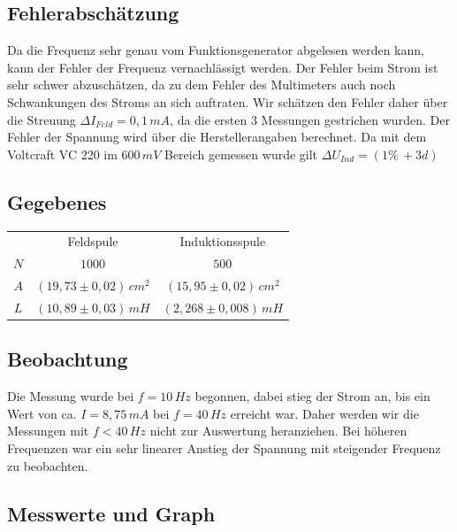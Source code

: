 \documentclass{article}
\begin{document}
\subsection{Fehlerabschätzung}
Da die Frequenz sehr genau vom Funktionsgenerator abgelesen werden kann, kann der Fehler der Frequenz vernachlässigt werden. Der Fehler beim Strom ist sehr schwer abzuschätzen, da zu dem Fehler des Multimeters auch noch Schwankungen des Stroms an sich auftraten. Wir schätzen den Fehler daher über die Streuung \(\Delta I_{Feld} = 0,1\, mA \), da die ersten 3 Messungen gestrichen wurden. Der Fehler der Spannung wird über die Herstellerangaben berechnet. Da mit dem Voltcraft VC 220 im \(600\, mV\) Bereich gemessen wurde gilt \(\Delta U_{Ind} = (1\% \, + 3d ) \)

\subsection{Gegebenes}

\begin{center}
\begin{tabular}{c c c}
 & Feldspule & Induktionsspule \\
 \(N\) & \(1000\) & \(500\) \\
\(A\) & \((19,73 \pm 0,02)\, cm^2\) & \((15,95 \pm 0,02)\, cm^2\) \\
 \(L\) & \((10,89 \pm 0,03)\, mH \) & \((2,268 \pm 0,008)\, mH \) \\

\end{tabular}
\end{center}

\subsection{Beobachtung}
Die Messung wurde bei \(f=10 \, Hz \) begonnen, dabei stieg der Strom an, bis ein Wert von ca. \(I = 8,75 \, mA \) bei \(f = 40 \, Hz \) erreicht war. Daher werden wir die Messungen mit \(f < 40\, Hz \) nicht zur Auswertung heranziehen. Bei höheren Frequenzen war ein sehr linearer Anstieg der Spannung mit steigender Frequenz zu beobachten.
\subsection{Messwerte und Graph}
\end{document}
